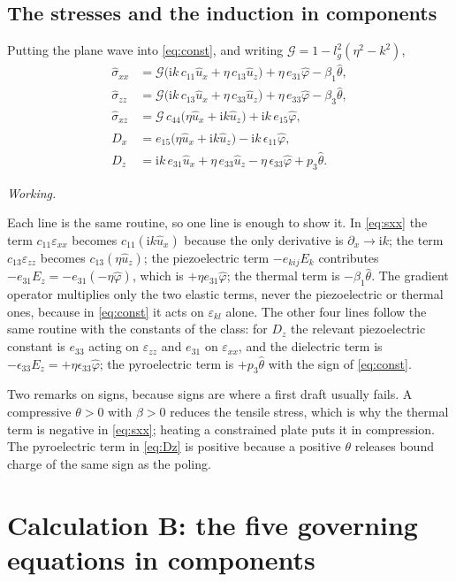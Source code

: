 \documentclass[11pt,a4paper]{article}
\newif\ifshowworked \showworkedtrue
\newenvironment{worked}{\ifshowworked\par\smallskip\noindent\textit{Working.}\par\else\setbox0\vbox\bgroup\fi}{\ifshowworked\par\smallskip\else\egroup\fi}
\newcommand{\Gc}{\mathcal{G}}
\newcommand{\eps}{\varepsilon}
\newcommand{\ii}{\mathrm{i}}
\newcommand{\bx}{\hat u_x}
\newcommand{\bz}{\hat u_z}
\newcommand{\bp}{\hat\varphi}
\newcommand{\bt}{\hat\theta}
\begin{document}
\subsection{The stresses and the induction in components}

Putting the plane wave into \eqref{eq:const}, and writing $\Gc=1-l_g^2(\eta^2-k^2)$,
\begin{align}
\hat\sigma_{xx}&=\Gc\bigl(\ii k\,c_{11}\bx+\eta\,c_{13}\bz\bigr)+\eta\,e_{31}\bp-\beta_1\bt,
\label{eq:sxx}\\
\hat\sigma_{zz}&=\Gc\bigl(\ii k\,c_{13}\bx+\eta\,c_{33}\bz\bigr)+\eta\,e_{33}\bp-\beta_3\bt,
\label{eq:szz}\\
\hat\sigma_{xz}&=\Gc\,c_{44}\bigl(\eta\bx+\ii k\bz\bigr)+\ii k\,e_{15}\bp,
\label{eq:sxz}\\
\hat D_x&=e_{15}\bigl(\eta\bx+\ii k\bz\bigr)-\ii k\,\epsilon_{11}\bp,
\label{eq:Dx}\\
\hat D_z&=\ii k\,e_{31}\bx+\eta\,e_{33}\bz-\eta\,\epsilon_{33}\bp+p_3\bt .
\label{eq:Dz}
\end{align}

\begin{worked}
Each line is the same routine, so one line is enough to show it. In \eqref{eq:sxx} the term $c_{11}\eps_{xx}$
becomes $c_{11}(\ii k\bx)$ because the only derivative is $\partial_x\to\ii k$; the term $c_{13}\eps_{zz}$
becomes $c_{13}(\eta\bz)$; the piezoelectric term $-e_{kij}E_k$ contributes $-e_{31}E_z=-e_{31}(-\eta\bp)$,
which is $+\eta e_{31}\bp$; the thermal term is $-\beta_1\bt$. The gradient operator multiplies only the two
elastic terms, never the piezoelectric or thermal ones, because in \eqref{eq:const} it acts on $\eps_{kl}$
alone. The other four lines follow the same routine with the constants of the class: for $D_z$ the relevant
piezoelectric constant is $e_{33}$ acting on $\eps_{zz}$ and $e_{31}$ on $\eps_{xx}$, and the dielectric
term is $-\epsilon_{33}E_z=+\eta\epsilon_{33}\bp$; the pyroelectric term is $+p_3\bt$ with the sign of
\eqref{eq:const}.
\end{worked}

Two remarks on signs, because signs are where a first draft usually fails. A compressive $\theta>0$ with
$\beta>0$ reduces the tensile stress, which is why the thermal term is negative in \eqref{eq:sxx}; heating a
constrained plate puts it in compression. The pyroelectric term in \eqref{eq:Dz} is positive because a
positive $\theta$ releases bound charge of the same sign as the poling.

\section{Calculation B: the five governing equations in components}\label{sec:B}
\end{document}
